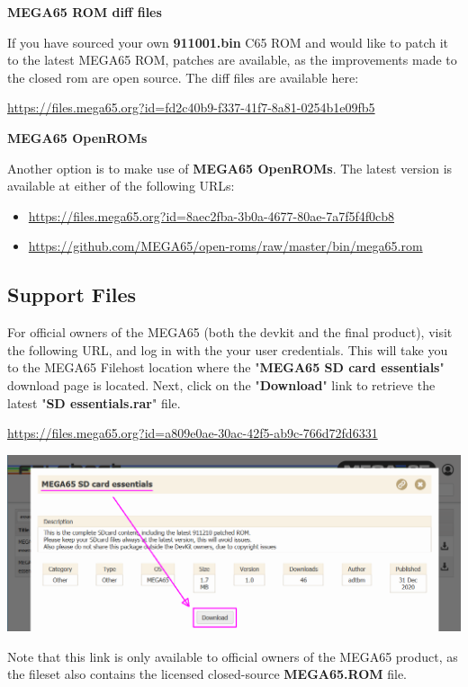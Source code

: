 \textbf{MEGA65 ROM diff files}

If you have sourced your own \textbf{911001.bin} C65 ROM and would like to patch it to the latest MEGA65 ROM, patches are available, as the improvements made to the closed rom are open source. The diff files are available here:

\url{https://files.mega65.org?id=fd2c40b9-f337-41f7-8a81-0254b1e09fb5}

\textbf{MEGA65 OpenROMs}

Another option is to make use of \textbf{MEGA65 OpenROMs}. The latest version is available at either of the following URLs:

\begin{itemize}
  \item \url{https://files.mega65.org?id=8aec2fba-3b0a-4677-80ae-7a7f5f4f0cb8}
  \item \url{https://github.com/MEGA65/open-roms/raw/master/bin/mega65.rom}
\end{itemize}


\subsection{Support Files}

For official owners of the MEGA65 (both the devkit and the final product), visit the following URL, and log in with the your user credentials. This will take you to the MEGA65 Filehost location where the "\textbf{MEGA65 SD card essentials}" download page is located. Next, click on the "\textbf{Download}" link to retrieve the latest "\textbf{SD essentials.rar}" file.

\url{https://files.mega65.org?id=a809e0ae-30ac-42f5-ab9c-766d72fd6331}

\includegraphics[width=\linewidth]{images/latest_support_files_with_closedrom.png}

Note that this link is only available to official owners of the MEGA65 product, as the fileset also contains the licensed closed-source \textbf{MEGA65.ROM} file.

